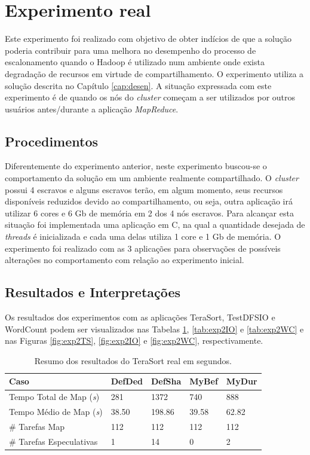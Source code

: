 \section{Experimento real}
\label{sec:expReal}
Este experimento foi realizado com objetivo de obter indícios de que a solução poderia contribuir para uma melhora no desempenho do processo de escalonamento quando o Hadoop é utilizado num ambiente onde exista degradação de recursos em virtude de compartilhamento. O experimento utiliza a solução descrita no Capítulo \ref{cap:desen}. A situação expressada com este experimento é de quando os nós do \textit{cluster} começam a ser utilizados por outros usuários antes/durante a aplicação \textit{MapReduce}.

\subsection{Procedimentos}
Diferentemente do experimento anterior, neste experimento buscou-se o comportamento da solução em um ambiente realmente compartilhado. O \textit{cluster} possui 4 escravos e alguns escravos terão, em algum momento, seus recursos disponíveis reduzidos devido ao compartilhamento, ou seja, outra aplicação irá utilizar 6 cores e 6 Gb de memória em 2 dos 4 nós escravos. Para alcançar esta situação foi implementada uma aplicação em C, na qual a quantidade desejada de \textit{threads} é inicializada e cada uma delas utiliza 1 core e 1 Gb de memória. O experimento foi realizado com as 3 aplicações para observações de possíveis alterações no comportamento com relação ao experimento inicial.

\subsection{Resultados e Interpretações}
Os resultados dos experimentos com as aplicações TeraSort, TestDFSIO e WordCount podem ser visualizados nas Tabelas \ref{tab:exp2TS}, \ref{tab:exp2IO} e \ref{tab:exp2WC} e nas Figuras \ref{fig:exp2TS}, \ref{fig:exp2IO} e \ref{fig:exp2WC}, respectivamente.

\begin{table}[h!]
	\caption{Resumo dos resultados do TeraSort real em segundos.} \label{tab:exp2TS}
	\begin{tabular*}{\hsize}{lllll} %
		\textbf{Caso} & \textbf{DefDed} & \textbf{DefSha} & \textbf{MyBef} & \textbf{MyDur}\\
		\hline
		Tempo Total de Map ({\it{s}}) & 281 & 1372 & 740 & 888 \\
		Tempo Médio de Map ({\it{s}}) & 38.50 & 198.86 & 39.58 & 62.82 \\
		\# Tarefas Map & 112 & 112 & 112 & 112 \\
		\# Tarefas Especulativas & 1 & 14 & 0 & 2 \\
	\end{tabular*}
\end{table}

